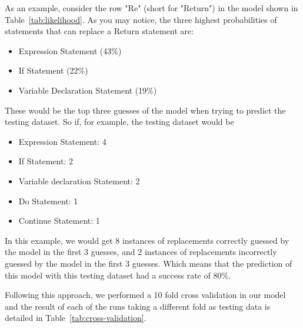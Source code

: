 
As an example, consider the row "Re" (short for "Return") in the model shown in Table~\ref{tab:likelihood}. As you may notice, the three highest probabilities of statements that can replace a Return statement are:
\begin{itemize}
  \item Expression Statement (43\%)
  \item If Statement (22\%)
  \item Variable Declaration Statement (19\%)
\end{itemize}
These would be the top three guesses of the model when trying to predict the testing dataset.
So if, for example, the testing dataset would be
\begin{itemize}
  \color{ForestGreen}  
  \item Expression Statement: 4
  \item If Statement: 2
  \item Variable declaration Statement: 2
    \color{red}  
  \item Do Statement: 1
  \item Continue Statement: 1
\end{itemize}

In this example, we would get 8 instances of replacements correctly guessed by the model in the first 3 guesses, and 2 instances of replacements incorrectly guessed by the model in the first 3 guesses. Which means that the prediction of this model with this testing dataset had a success rate of 80\%.

Following this approach, we performed a 10 fold cross validation in our model and the result of each of the runs taking a different fold as testing data is detailed in Table~\ref{tab:cross-validation}.


